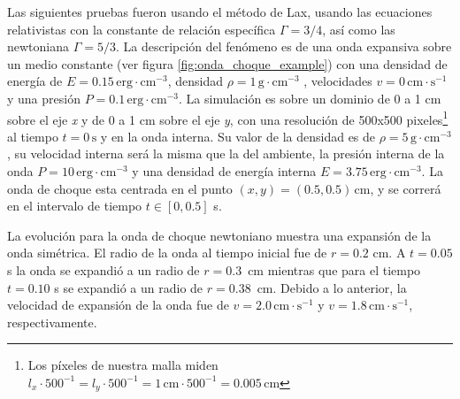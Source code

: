 \documentclass[12pt,a4paper]{book}
\begin{document}


Las siguientes pruebas fueron usando el método de Lax, usando las ecuaciones relativistas con la constante de relación específica $\Gamma = 3/4$, así como las newtoniana $\Gamma = 5/3$. La descripción del fenómeno es de una onda expansiva sobre un medio constante (ver figura \ref{fig:onda_choque_example}) con una densidad de energía de $E = 0.15 \, \mathrm{erg} \cdot \mathrm{cm}^{-3}$, densidad $\rho = 1 \, \mathrm{g} \cdot \mathrm{cm}^{-3}$ , velocidades $v = 0 \, \mathrm{cm} \cdot \mathrm{s}^{-1}$ y una presión $P=0.1 \, \mathrm{erg} \cdot \mathrm{cm}^{-3} $. La simulación es sobre un dominio de 0 a 1 cm sobre el eje \emph{x} y de 0 a 1 cm sobre el eje \emph{y}, con una resolución de 500x500 pixeles\footnote{Los píxeles de nuestra malla miden $l_x\cdot 500^{-1} = l_y\cdot 500^{-1}  = 1 \, \mathrm{cm} \cdot 500^{-1} = 0.005 \, \mathrm{cm}$} al tiempo $t=0 \, \mathrm{s}$  y en la onda interna. Su valor de la densidad es de $\rho=5 \, \mathrm{g} \cdot \mathrm{cm}^{-3}$, su velocidad interna será la misma que la del ambiente, la presión interna de la onda $P=10 \, \mathrm{erg} \cdot \mathrm{cm}^{-3} $ y una densidad de energía interna $E = 3.75 \, \mathrm{erg} \cdot \mathrm{cm}^{-3}$. La onda de choque esta centrada en el punto $(x,y) = (0.5, 0.5) \, \mathrm{cm}$, y se correrá en el intervalo de tiempo $t \in \left[ 0 , 0.5 \right]$ s.

La evolución para la onda de choque newtoniano muestra una expansión de la onda simétrica. El radio de la onda al tiempo inicial fue de $r=0.2$ cm. A $t=0.05$ s la onda se expandió a un radio de $r=0.3$~cm mientras que para el tiempo $t=0.10$ s se expandió a un radio de $r=0.38$~cm. Debido a lo anterior, la velocidad de expansión de la onda fue de $v = 2.0 \, \mathrm{cm} \cdot \mathrm{s}^{-1}$ y $v = 1.8 \, \mathrm{cm} \cdot \mathrm{s}^{-1}$, respectivamente.%
\end{document}
